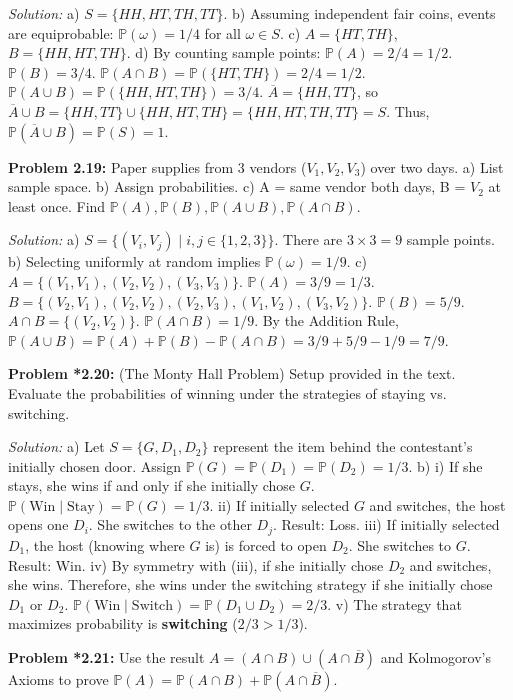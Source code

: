 \documentclass[11pt]{article}
\newcommand{\prob}[1]{\vspace{4mm}\noindent\textbf{Problem #1:}}
\newcommand{\sol}{\vspace{2mm}\noindent\textit{Solution: }}
\begin{document}
\sol 
a) $S = \{HH, HT, TH, TT\}$.
b) Assuming independent fair coins, events are equiprobable: $\mathbb{P}(\omega) = 1/4$ for all $\omega \in S$.
c) $A = \{HT, TH\}$, $B = \{HH, HT, TH\}$.
d) By counting sample points:
$\mathbb{P}(A) = 2/4 = 1/2$.
$\mathbb{P}(B) = 3/4$.
$\mathbb{P}(A \cap B) = \mathbb{P}(\{HT, TH\}) = 2/4 = 1/2$.
$\mathbb{P}(A \cup B) = \mathbb{P}(\{HH, HT, TH\}) = 3/4$.
$\overline{A} = \{HH, TT\}$, so $\overline{A} \cup B = \{HH, TT\} \cup \{HH, HT, TH\} = \{HH, HT, TH, TT\} = S$. Thus, $\mathbb{P}(\overline{A} \cup B) = \mathbb{P}(S) = 1$.

\prob{2.19}
Paper supplies from 3 vendors ($V_1, V_2, V_3$) over two days.
a) List sample space. b) Assign probabilities. c) A = same vendor both days, B = $V_2$ at least once. Find $\mathbb{P}(A), \mathbb{P}(B), \mathbb{P}(A \cup B), \mathbb{P}(A \cap B)$.

\sol 
a) $S = \{(V_i, V_j) \mid i,j \in \{1, 2, 3\}\}$. There are $3 \times 3 = 9$ sample points.
b) Selecting uniformly at random implies $\mathbb{P}(\omega) = 1/9$.
c) $A = \{(V_1,V_1), (V_2,V_2), (V_3,V_3)\}$. $\mathbb{P}(A) = 3/9 = 1/3$.
$B = \{(V_2,V_1), (V_2,V_2), (V_2,V_3), (V_1,V_2), (V_3,V_2)\}$. $\mathbb{P}(B) = 5/9$.
$A \cap B = \{(V_2,V_2)\}$. $\mathbb{P}(A \cap B) = 1/9$.
By the Addition Rule, $\mathbb{P}(A \cup B) = \mathbb{P}(A) + \mathbb{P}(B) - \mathbb{P}(A \cap B) = 3/9 + 5/9 - 1/9 = 7/9$.

\prob{*2.20} (The Monty Hall Problem)
Setup provided in the text. Evaluate the probabilities of winning under the strategies of staying vs. switching.

\sol 
a) Let $S = \{G, D_1, D_2\}$ represent the item behind the contestant's initially chosen door. Assign $\mathbb{P}(G) = \mathbb{P}(D_1) = \mathbb{P}(D_2) = 1/3$.
b) 
i) If she stays, she wins if and only if she initially chose $G$. $\mathbb{P}(\text{Win} \mid \text{Stay}) = \mathbb{P}(G) = 1/3$.
ii) If initially selected $G$ and switches, the host opens one $D_i$. She switches to the other $D_j$. Result: Loss.
iii) If initially selected $D_1$, the host (knowing where $G$ is) is forced to open $D_2$. She switches to $G$. Result: Win.
iv) By symmetry with (iii), if she initially chose $D_2$ and switches, she wins. Therefore, she wins under the switching strategy if she initially chose $D_1$ or $D_2$.
$\mathbb{P}(\text{Win} \mid \text{Switch}) = \mathbb{P}(D_1 \cup D_2) = 2/3$.
v) The strategy that maximizes probability is \textbf{switching} ($2/3 > 1/3$).

\prob{*2.21}
Use the result $A = (A \cap B) \cup (A \cap \overline{B})$ and Kolmogorov's Axioms to prove $\mathbb{P}(A) = \mathbb{P}(A \cap B) + \mathbb{P}(A \cap \overline{B})$.
\end{document}
